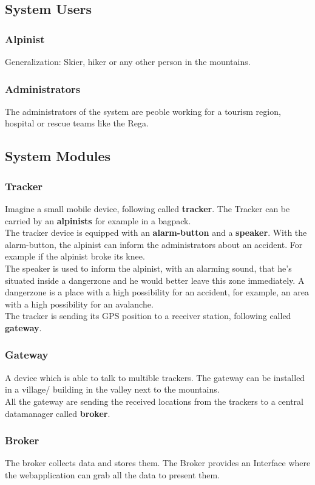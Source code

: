 \documentclass[a4paper,11pt, oneside]{report}
\theoremstyle{definition}
\begin{document}
\subsection{System Users}
\subsubsection{Alpinist}
Generalization: Skier, hiker or any other person in the mountains.
\subsubsection{Administrators}
The administrators of the system are peoble working for a tourism region, hospital or rescue teams like the Rega.

\subsection{System Modules}
\subsubsection{Tracker}
Imagine a small mobile device, following called \textbf{tracker}. The Tracker can be carried by an \textbf{alpinists} for example in a bagpack.\\[0.3cm]
The tracker device is equipped with an \textbf{alarm-button} and a \textbf{speaker}. With the alarm-button, the alpinist can inform the administrators about an accident. For example if the alpinist broke its knee.\\[0.3cm]
The speaker is used to inform the alpinist, with an alarming sound, that he's situated inside a dangerzone and he would better leave this zone immediately. A dangerzone is a place with a high possibility for an accident, for example, an area with a high possibility for an avalanche.\\[0.3cm]
The tracker is sending its GPS position to a receiver station, following called \textbf{gateway}. 
\subsubsection{Gateway}
A device which is able to talk to multible trackers. The gateway can be installed in a village/ building in the valley next to the mountains.\\[0.3cm]
All the gateway are sending the received locations from the trackers to a central datamanager called \textbf{broker}. 
\subsubsection{Broker}
The broker collects data and stores them. The Broker provides an Interface where the webapplication can grab all the data to present them.
\end{document}
